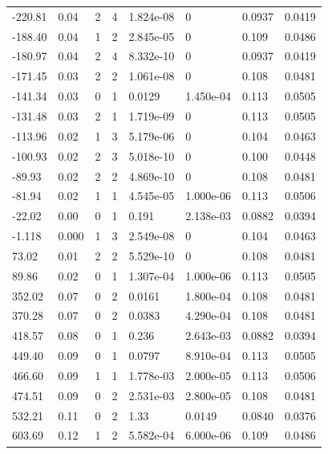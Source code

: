 \documentclass[preview]{standalone}
\begin{document}
{{\begin{tabular}{L{1.2cm}C{1.2cm} C{0.3cm}C{0.5cm} C{1.4cm}C{1.4cm} C{1.4cm}C{1.4cm}}
  -220.81  &  0.04  & 2     &  4 &  1.824e-08  & 0  & 0.0937 &  0.0419   \\ 
  -188.40  &  0.04  & 1     &  2 &  2.845e-05  & 0  & 0.109 &  0.0486   \\ 
  -180.97  &  0.04  & 2     &  4 &  8.332e-10  & 0  & 0.0937 &  0.0419   \\ 
  -171.45  &  0.03  & 2     &  2 &  1.061e-08  & 0  & 0.108 &  0.0481   \\ 
  -141.34  &  0.03  & 0     &  1 &  0.0129  & 1.450e-04  & 0.113 &  0.0505   \\ 
  -131.48  &  0.03  & 2     &  1 &  1.719e-09  & 0  & 0.113 &  0.0505   \\ 
  -113.96  &  0.02  & 1     &  3 &  5.179e-06  & 0  & 0.104 &  0.0463   \\ 
  -100.93  &  0.02  & 2     &  3 &  5.018e-10  & 0  & 0.100 &  0.0448   \\ 
  -89.93  &  0.02  & 2     &  2 &  4.869e-10  & 0  & 0.108 &  0.0481   \\ 
  -81.94  &  0.02  & 1     &  1 &  4.545e-05  & 1.000e-06  & 0.113 &  0.0506   \\ 
  -22.02  &  0.00  & 0     &  1 &  0.191  & 2.138e-03  & 0.0882 &  0.0394   \\ 
  -1.118  &  0.000  & 1     &  3 &  2.549e-08  & 0  & 0.104 &  0.0463   \\ 
  73.02  &  0.01  & 2     &  2 &  5.529e-10  & 0  & 0.108 &  0.0481   \\ 
  89.86  &  0.02  & 0     &  1 &  1.307e-04  & 1.000e-06  & 0.113 &  0.0505   \\ 
  352.02  &  0.07  & 0     &  2 &  0.0161  & 1.800e-04  & 0.108 &  0.0481   \\ 
  370.28  &  0.07  & 0     &  2 &  0.0383  & 4.290e-04  & 0.108 &  0.0481   \\ 
  418.57  &  0.08  & 0     &  1 &  0.236  & 2.643e-03  & 0.0882 &  0.0394   \\ 
  449.40  &  0.09  & 0     &  1 &  0.0797  & 8.910e-04  & 0.113 &  0.0505   \\ 
  466.60  &  0.09  & 1     &  1 &  1.778e-03  & 2.000e-05  & 0.113 &  0.0506   \\ 
  474.51  &  0.09  & 0     &  2 &  2.531e-03  & 2.800e-05  & 0.108 &  0.0481   \\ 
  532.21  &  0.11  & 0     &  2 &  1.33  & 0.0149  & 0.0840 &  0.0376   \\ 
  603.69  &  0.12  & 1     &  2 &  5.582e-04  & 6.000e-06  & 0.109 &  0.0486   \\ 

\end{tabular}}}
\end{document}
